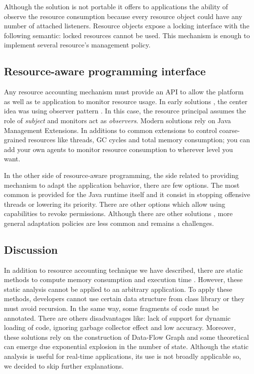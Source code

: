 Although the solution is not portable it offers to applications the ability of observe the resource consumption because every resource object could have any number of attached listeners. Resource objects expose a locking interface with the following semantic: locked resources cannot be used. This mechanism is enough to implement several resource's management policy.

\subsection{Resource-aware programming interface}
Any resource accounting mechanism must provide an API to allow the platform as well as te application to monitor resource usage. In early solutions \cite{czajkowski_jres:_1998, czajkowski_resource_2003}, the center idea was using observer pattern \cite{Gamma:1995:DPE:186897}. In this case, the resource principal assumes the role of \textit{subject} and monitors act as \textit{observers}. Modern solutions rely on Java Management Extensions. In additions to common extensions to control coarse-grained resources like threads, GC cycles and total memory consumption; you can add your own agents to monitor resource consumption to wherever level you want.

In the other side of resource-aware programming, the side related to providing mechanism to adapt the application behavior, there are few options. The most common is provided for the Java runtime itself and it consist in stopping offensive threads or lowering its priority. There are other options which allow using capabilities \cite{Hawblitzel:1998:IMP:1268256.1268278} to revoke permissions. Although there are other solutions \cite{guidec:hal-00342142}, more general adaptation policies are less common and remains a challenges.

\subsection{Discussion}
In addition to resource accounting technique we have described, there are static methods to compute memory consumption and execution time \cite{Puffitsch:2010:WAH:1939345.1939394,Schoeberl:2010:WET:1780354.1780356}. However, these static analysis cannot be applied to an arbitrary application. To apply these methods, developers cannot use certain data structure from class library or they must avoid recursion. In the same way, some fragments of code must be annotated. There are others disadvantages like: lack of support for dynamic loading of code, ignoring garbage collector effect and low accuracy. Moreover, these solutions rely on the construction of Data-Flow Graph and some theoretical can emerge due exponential explosion in the number of state. Although the static analysis is useful for real-time applications, its use is not broadly applicable so, we decided to skip further explanations.

